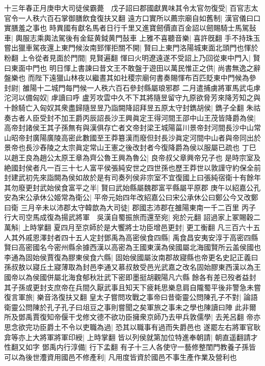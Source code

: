 十三年春正月庚申大司徒侯霸薨　戊子詔曰郡國獻異味其令太官勿復受|{
	百官志太官令一人秩六百石掌御膳飲食復扶又翻}
遠方口實所以薦宗廟自如舊制|{
	漢官儀曰口實膳羞之事也}
時異國有獻名馬者日行千里又進寶劒價直百金詔以劒賜騎士馬駕鼔車|{
	輿服志乘輿法駕後有金鉦黄鉞黄門鼔車}
上雅不喜聽音樂|{
	喜許旣翻}
手不持珠玉嘗出獵車駕夜還上東門候汝南郅惲拒關不開|{
	賢曰上東門洛陽城東面北頭門也惲於粉翻}
上令從者見面於門間|{
	見賢遍翻}
惲曰火明遼遠遂不受詔上乃回從東中門入|{
	賢曰東面中門也}
明日惲上書諫曰昔文王不敢盤于遊田以萬民惟正之供|{
	尚書無逸之辭盤樂也}
而陛下遠獵山林夜以繼晝其如社稷宗廟何書奏賜惲布百匹貶東中門候為參封尉|{
	雒陽十二城門每門候一人秩六百石參封縣屬琅邪郡}
二月遣捕虜將軍馬武屯虖沱河以備匈奴|{
	虖讀曰呼}
盧芳攻雲中久不下其將隨昱留守九原欲脅芳來降芳知之與十餘騎亡入匈奴其衆盡歸隨昱昱乃詣闕降詔拜昱五原太守封鐫胡侯|{
	鐫子全翻}
朱祜奏古者人臣受封不加王爵丙辰詔長沙王興眞定王得河間王邵中山王茂皆降爵為侯|{
	高帝封諸侯王其子孫無有與漢俱存亡者文帝封梁王城陽菑川景帝封河間長沙中山常山昭帝封廣陽廣陵高密此數國至王莽簒漢而廢但封長沙眞定河間中山者與帝同出於景帝也長沙舂陵之太宗眞定常山王憲之後改封者今復降爵為侯以服屬已疏也}
丁巳以趙王良為趙公太原王章為齊公魯王興為魯公|{
	良帝叔父章興帝兄子也}
是時宗室及絶國封侯者凡一百三十七人富平侯張純安世之四世孫也歷王莽世以敦謹守約保全前封建武初先來詣闕為侯如故於是有司奏列侯非宗室不宜復國上曰張純宿衛十有餘年其勿廢更封武始侯食富平之半|{
	賢曰武始縣屬魏郡富平縣屬平原郡}
庚午以紹嘉公孔安為宋公承休公姬常為衛公|{
	平帝元始四年改紹嘉公曰宋公承休公曰鄭公今又改鄭曰衛}
三月辛未以沛郡太守韓歆為大司徒|{
	郡國志沛郡在雒陽東南一千二百里}
丙子行大司空馬成復為揚武將軍　吳漢自蜀振旅而還至宛|{
	宛於元翻}
詔過家上冢賜穀二萬斛|{
	上時掌翻}
夏四月至京師於是大饗將士功臣增邑更封|{
	更工衡翻}
凡三百六十五人其外戚恩澤封者四十五人定封鄧禹為高密侯食四縣|{
	禹食昌安夷安淳于高密四縣賢曰高密國名今密州縣余據西漢以高密為王國東漢為侯國屬北海國賢所云盖侯國也}
李通為固始侯賈復為膠東侯食六縣|{
	固始侯國屬汝南郡故寢縣也帝更名史記正義曰孫叔敖以寢丘土寢薄取為封邑李通又慕叔敖受邑光武嘉之改名固始膠東西漢以為王國帝以為侯國併屬北海食郁秋壯武下密即墨挺胡觀陽凡六縣}
餘各有差已歿者益封其子孫或更封支庶帝在兵間久厭武事且知天下疲耗思樂息肩自隴蜀平後非警急未嘗復言軍旅|{
	樂音洛復扶又翻}
皇太子嘗問攻戰之事帝曰昔衛靈公問陳孔子不對|{
	論語衛靈公問陳於孔子孔子曰俎豆之事則嘗聞之矣軍旅之事未之學也陳讀曰陣}
此非爾所及鄧禹賈復知帝偃干戈修文德不欲功臣擁衆京師乃去甲兵敦儒學|{
	去羌呂翻}
帝亦思念欲完功臣爵土不令以吏職為過|{
	恐其以職事有過而失爵邑也}
遂罷左右將軍官耿弇等亦上大將軍將軍印綬|{
	上時掌翻}
皆以列侯就第加位特進奉朝請|{
	朝直遥翻請才性翻又如字}
鄧禹内行淳備|{
	行下孟翻}
有子十三人各使守一藝修整閨門教養子孫皆可以為後世灋資用國邑不修產利|{
	凡用度皆資於國邑不事生產作業及營利也}
